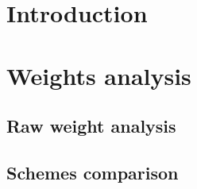 \chapter*{Introduction}


{}


{}


{}

        
{}



\chapter{Weights analysis}

    \section{Raw weight analysis}
    
    
    \section{Schemes comparison}
